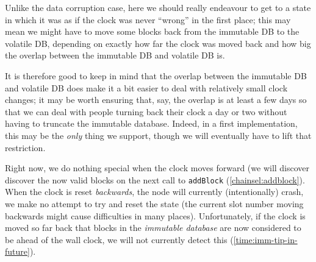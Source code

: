 Unlike the data corruption case, here we should really endeavour to get to a
state in which it was as if the clock was never ``wrong'' in the first place;
this may mean we might have to move some blocks back from the immutable DB to
the volatile DB, depending on exactly how far the clock was moved back and how
big the overlap between the immutable DB and volatile DB is.

It is therefore good to keep in mind that the overlap between the immutable DB
and volatile DB does make it a bit easier to deal with relatively small clock
changes; it may be worth ensuring that, say, the overlap is at least a few days
so that we can deal with people turning back their clock a day or two without
having to truncate the immutable database. Indeed, in a first implementation,
this may be the \emph{only} thing we support, though we will eventually have to
lift that restriction.

Right now, we do nothing special when the clock moves forward (we will discover
discover the now valid blocks on the next call to \lstinline!addBlock!
(\cref{chainsel:addblock}). When the clock is reset \emph{backwards}, the node
will currently (intentionally) crash, we make no attempt to try and reset
the state (the current slot number moving backwards might cause difficulties
in many places). Unfortunately, if the clock is moved so far back that blocks
in the \emph{immutable database} are now considered to be ahead of the wall
clock, we will not currently detect this (\cref{time:imm-tip-in-future}).
